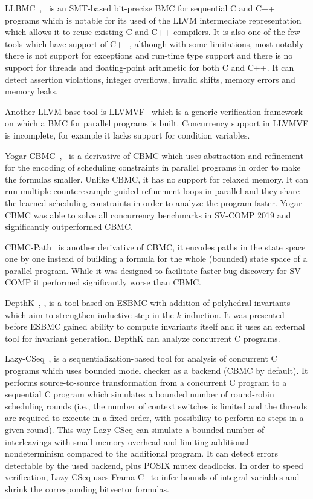 LLBMC~\cite{Merz2012},~\cite{Falke2013} is an SMT-based bit-precise BMC for
sequential C and C++ programs which is notable for its used of the LLVM
intermediate representation which allows it to reuse existing C and C++
compilers.
It is also one of the few tools which have support of C++, although with some
limitations, most notably there is not support for exceptions and run-time type
support and there is no support for threads and floating-point arithmetic for
both C and C++.
It can detect assertion violations, integer overflows, invalid shifts, memory
errors and memory leaks.

Another LLVM-base tool is LLVMVF~\cite{Sousa2013} which is a generic verification framework on which a BMC for parallel programs is built.
Concurrency support in LLVMVF is incomplete, for example it lacks support for condition variables.

Yogar-CBMC~\cite{Yin2018},~\cite{Yin2019} is a derivative of CBMC which uses
abstraction and refinement for the encoding of scheduling constraints in
parallel programs in order to make the formulas smaller.
Unlike CBMC, it has no support for relaxed memory.
It can run multiple counterexample-guided refinement loops in parallel and they
share the learned scheduling constraints in order to analyze the program
faster.
Yogar-CBMC was able to solve all concurrency benchmarks in SV-COMP 2019 and significantly outperformed CBMC.

CBMC-Path~\cite{Khazem2019} is another derivative of CBMC, it encodes paths in
the state space one by one instead of building a formula for the whole
(bounded) state space of a parallel program.
While it was designed to facilitate faster bug discovery for SV-COMP it performed significantly worse than CBMC.

DepthK~\cite{Rocha2017}, \cite{Rocha2017svc}, is a tool based on ESBMC with
addition of polyhedral invariants which aim to strengthen inductive step in the
$k$-induction.
It was presented before ESBMC gained ability to compute invariants itself and it uses an external tool for invariant generation.
DepthK can analyze concurrent C programs.

Lazy-CSeq~\cite{Inverso2015}, \cite{Nguyen2017} is a sequentialization-based
tool for analysis of concurrent C programs which uses bounded model checker as
a backend (CBMC by default).
It performs source-to-source transformation from a concurrent C program to a
sequential C program which simulates a bounded number of round-robin scheduling
rounds (i.e., the number of context switches is limited and the threads are
required to execute in a fixed order, with possibility to perform no steps in a
given round).
This way Lazy-CSeq can simulate a bounded number of interleavings with small
memory overhead and limiting additional nondeterminism compared to the
additional program.
It can detect errors detectable by the used backend, plus POSIX mutex
deadlocks.
In order to speed verification, Lazy-CSeq uses Frama-C~\cite{Canet2009} to
infer  bounds of integral variables and shrink the corresponding bitvector
formulas.

